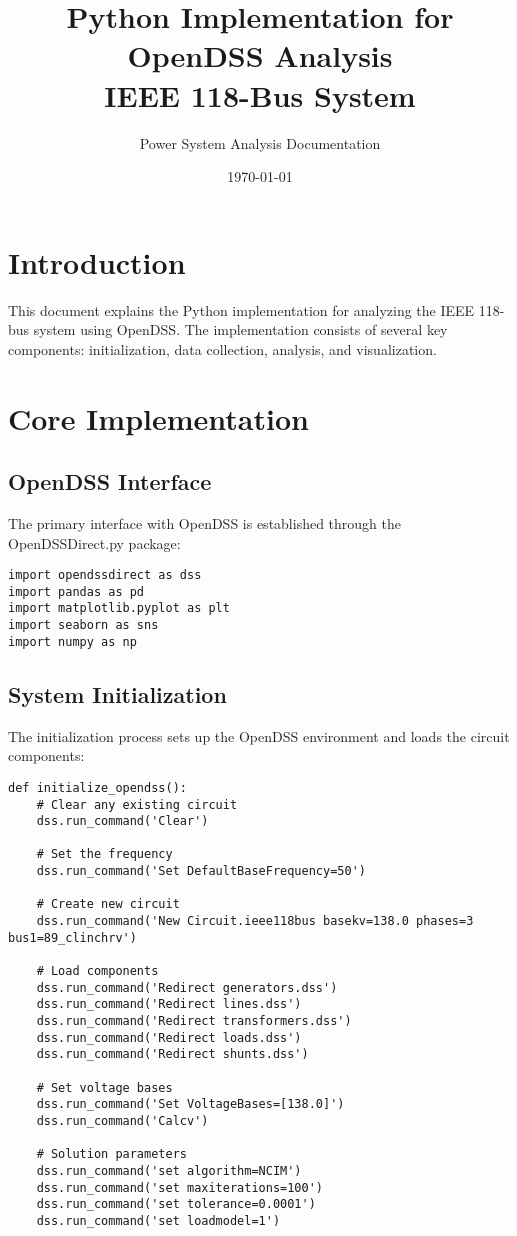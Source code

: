 \documentclass[11pt]{article}
\title{Python Implementation for OpenDSS Analysis\\IEEE 118-Bus System}
\author{Power System Analysis Documentation}
\date{\today}
\begin{document}
\maketitle

\section{Introduction}
This document explains the Python implementation for analyzing the IEEE 118-bus system using OpenDSS. The implementation consists of several key components: initialization, data collection, analysis, and visualization.

\section{Core Implementation}

\subsection{OpenDSS Interface}
The primary interface with OpenDSS is established through the OpenDSSDirect.py package:

\begin{lstlisting}[caption=OpenDSS Interface Setup]
import opendssdirect as dss
import pandas as pd
import matplotlib.pyplot as plt
import seaborn as sns
import numpy as np
\end{lstlisting}

\subsection{System Initialization}
The initialization process sets up the OpenDSS environment and loads the circuit components:

\begin{lstlisting}[caption=System Initialization Function]
def initialize_opendss():
    # Clear any existing circuit
    dss.run_command('Clear')
    
    # Set the frequency
    dss.run_command('Set DefaultBaseFrequency=50')
    
    # Create new circuit
    dss.run_command('New Circuit.ieee118bus basekv=138.0 phases=3 bus1=89_clinchrv')
    
    # Load components
    dss.run_command('Redirect generators.dss')
    dss.run_command('Redirect lines.dss')
    dss.run_command('Redirect transformers.dss')
    dss.run_command('Redirect loads.dss')
    dss.run_command('Redirect shunts.dss')
    
    # Set voltage bases
    dss.run_command('Set VoltageBases=[138.0]')
    dss.run_command('Calcv')
    
    # Solution parameters
    dss.run_command('set algorithm=NCIM')
    dss.run_command('set maxiterations=100')
    dss.run_command('set tolerance=0.0001')
    dss.run_command('set loadmodel=1')
\end{lstlisting}
\end{document}
